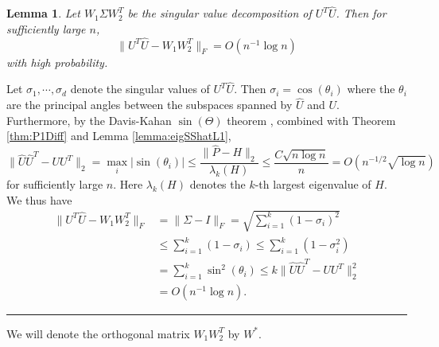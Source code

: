 \documentclass[a4paper]{article}
\newenvironment{proof}{{\bf Proof:  }}{\hfill\rule{2mm}{2mm}}
\newtheorem{lemma}[fact]{Lemma}
\begin{document}
\begin{lemma}
\label{lemma:AlmostOrthogonalL1}
Let $W_1 \Sigma W_2^T$ be the singular value decomposition of $U^T \hat{U}$. Then for sufficiently large $n$, 
\[
	\| U^T \hat{U} - W_1 W_2^T \|_F = O(n^{-1} \log n)
\]
with high probability.
\end{lemma}
\begin{proof}
Let $\sigma_1, \cdots, \sigma_d$ denote the singular values of $U^T \hat{U}$. Then $\sigma_i = \cos(\theta_i)$ where the $\theta_i$ are the principal angles between the subspaces spanned by $\hat{U}$ and $U$. Furthermore, by the Davis-Kahan $\sin(\Theta)$ theorem \cite{davis1970rotation}, combined with Theorem \ref{thm:P1Diff} and Lemma \ref{lemma:eigSShatL1},
\begin{equation}
\label{eqn:uhat2u2diffL1}
	\|\hat{U} \hat{U}^T - U U^T\|_2 = \max_i |\sin(\theta_i)|
    \le \frac{\|\hat{P} - H\|_2}{\lambda_k(H)}
    \le \frac{C \sqrt{n \log n}}{n} = O(n^{-1/2} \sqrt{\log n})
\end{equation}
for sufficiently large $n$. Here $\lambda_k(H)$ denotes the $k$-th largest eigenvalue of $H$.\\
We thus have
\begin{align*}
	\| U^T \hat{U} - W_1 W_2^T \|_F
    & = \| \Sigma - I \|_F
    = \sqrt{\sum_{i=1}^k (1-\sigma_i)^2} \\
    & \le \sum_{i=1}^k (1-\sigma_i) \le \sum_{i=1}^k (1-\sigma_i^2) \\
    & = \sum_{i=1}^k \sin^2(\theta_i)
    \le k \|\hat{U} \hat{U}^T - U U^T\|_2^2 \\
    & = O(n^{-1} \log n).
\end{align*}
\end{proof}

We will denote the orthogonal matrix $W_1 W_2^T$ by $W^*$.
\end{document}
